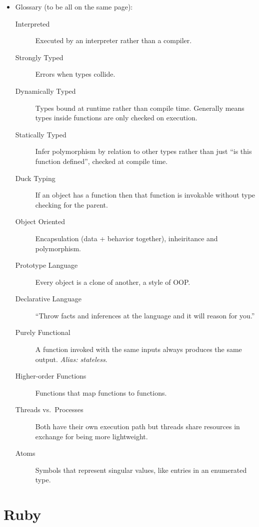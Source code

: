 \documentclass[10pt]{article}
\begin{document}
\begin{itemize}
    \item Glossary (to be all on the same page):
        \begin{description}
            \item[Interpreted] Executed by an interpreter rather than a
                compiler.
            \item[Strongly Typed] Errors when types collide.
            \item[Dynamically Typed] Types bound at runtime rather than compile
                time. Generally means types inside functions are only checked on
                execution.
            \item[Statically Typed] Infer polymorphism by relation to other
                types rather than just ``is this function defined'', checked at
                compile time.
            \item[Duck Typing] If an object has a function then that function is
                invokable without type checking for the parent.
            \item[Object Oriented] Encapsulation (data + behavior together),
                inheiritance and polymorphism.
            \item[Prototype Language] Every object is a clone of another, a
                style of OOP.\@
            \item[Declarative Language] ``Throw facts and inferences at the
                language and it will reason for you.''
            \item[Purely Functional] A function invoked with the same inputs
                always produces the same output. \emph{Alias: stateless}.
            \item[Higher-order Functions] Functions that map functions to
                functions.
            \item[Threads vs.\ Processes] Both have their own execution path but
                threads share resources in exchange for being more lightweight.
            \item[Atoms] Symbols that represent singular values, like entries in
                an enumerated type.
        \end{description}
\end{itemize}

\section{Ruby}
\end{document}
